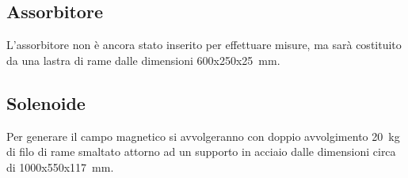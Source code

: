 \subsection{Assorbitore}
L'assorbitore non è ancora stato inserito per effettuare misure, ma sarà costituito da una lastra di rame dalle dimensioni 600x250x25~mm.

\subsection{Solenoide}
Per generare il campo magnetico si avvolgeranno con doppio avvolgimento 20~kg di filo di rame smaltato attorno ad un supporto in acciaio dalle dimensioni circa
di 1000x550x117~mm.
